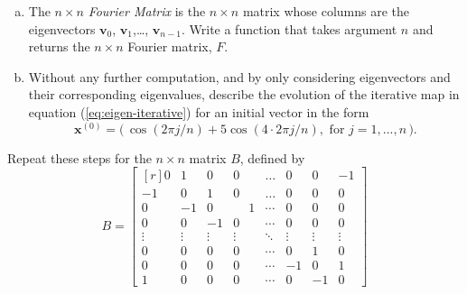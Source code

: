 \begin{enumerate}[(a)]
	 \item The $n \times n$ \textit{Fourier Matrix} is the $n \times n$ matrix whose columns are the eigenvectors $\bm{v}_0$, $\bm{v}_1$,\ldots, $\bm{v}_{n-1}$.  Write a function that takes argument $n$ and returns the $n\times n$ Fourier matrix, $F$. 
  \item Without any further computation, and by only considering eigenvectors and their corresponding eigenvalues, describe the evolution of the iterative map in equation (\ref{eq:eigen-iterative}) for an initial vector in the form
\begin{equation*}
	\bm{x}^{(0)} = \big(\, \cos(2\pi j / n) + 5 \cos( 4 \cdot 2\pi j / n), \text{ for } j = 1,...,n\,\big).
\end{equation*}
\end{enumerate}
Repeat these steps for the $n \times n$ matrix $B$, defined by
\begin{equation}
B = \begin{bmatrix*}[r] 0 & 1 & 0 & 0 & \dots & 0 & 0 & -1 \\ -1 & 0 & 1 & 0 & \dots& 0 & 0 & 0 \\ 0 & -1 & 0 & \phantom{+}1 & \cdots&0 & 0 & 0 \\ 0 & 0 & -1 & 0 & \cdots&0 & 0 & 0 \\ \vdots & \vdots & \vdots & \vdots & \ddots & \vdots & \vdots & \vdots \\ 0 & 0 & 0 & 0 & \cdots & 0 & 1 & 0 \\ 0 & 0 & 0 & 0 & \cdots & -1 & 0 & 1\\ 1 & 0 & 0 & 0 & \cdots & 0 & -1 & 0 \end{bmatrix*}
\end{equation}
